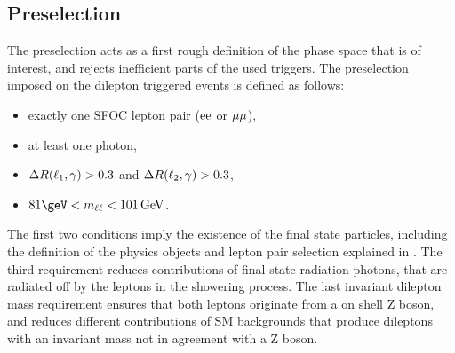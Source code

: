 \subsection{Preselection}
The preselection acts as a first rough definition of the phase space that is of interest, and rejects inefficient parts of the used triggers. The preselection imposed on the dilepton triggered events is defined as follows:
\begin{itemize}
 \item exactly one SFOC lepton pair ($\mathrm{e}\mathrm{e}$ or $\mu\mu$),
 \item at least one photon,
 \item $\Delta R(\ell_1,\gamma)>0.3$ and $\Delta R(\ell_2,\gamma)>0.3$,
 \item $81\geV<m_{\ell\ell}<101\GeV$.
\end{itemize}
The first two conditions imply the existence of the final state particles, including the definition of the physics objects and lepton pair selection explained in . The third requirement reduces contributions of final state radiation photons, that are radiated off by the leptons in the showering process. The last invariant dilepton mass requirement ensures that both leptons originate from a on shell Z boson, and reduces different contributions of SM backgrounds that produce dileptons with an invariant mass not in agreement with a Z boson.
